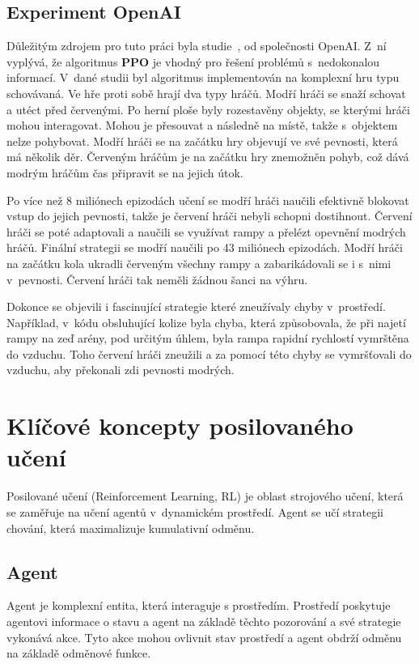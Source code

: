 \subsection{Experiment OpenAI}\label{subsec:experiment-openai}
Důležitým zdrojem pro tuto práci byla studie~\cite{PPO_Hide_Seek_paper}, od společnosti OpenAI.
Z~ní vyplývá, že algoritmus \textbf{PPO} je vhodný pro řešení problémů s~nedokonalou informací.
V~dané studii byl algoritmus implementován na komplexní hru typu schovávaná.
Ve hře proti sobě hrají dva typy hráčů.
Modří hráči se snaží schovat a utéct před červenými.
Po herní ploše byly rozestavěny objekty, se kterými hráči mohou interagovat.
Mohou je přesouvat a následně  na místě, takže s~objektem nelze pohybovat.
Modří hráči se na začátku hry objevují ve své pevnosti, která má několik děr.
Červeným hráčům je na začátku hry znemožněn pohyb, což dává modrým hráčům čas připravit se na jejich útok.

Po více než 8 miliónech epizodách učení se modří hráči naučili efektivně blokovat vstup do jejich pevnosti, takže je červení hráči nebyli schopni dostihnout.
Červení hráči se poté adaptovali a naučili se využívat rampy a přelézt opevnění modrých hráčů.
Finální strategii se modří naučili po 43 miliónech epizodách.
Modří hráči na začátku kola ukradli červeným všechny rampy a zabarikádovali se i s~nimi v~pevnosti.
Červení hráči tak neměli žádnou šanci na výhru.

Dokonce se objevili i fascinující strategie které zneužívaly chyby v~prostředí.
Například, v~kódu obsluhující kolize byla chyba, která způsobovala, že při najetí rampy na zeď arény, pod určitým úhlem, byla rampa rapidní rychlostí vymrštěna do vzduchu.
Toho červení hráči zneužili a za pomocí této chyby se vymršťovali do vzduchu, aby překonali zdi pevnosti modrých.


\section{Klíčové koncepty posilovaného učení}\label{sec:klicove-koncepty-posilovaneho-uceni}
Posilované učení (Reinforcement Learning, RL) je oblast strojového učení, která se zaměřuje na učení agentů v~dynamickém prostředí.
Agent se učí strategii chování, která maximalizuje kumulativní odměnu.

\subsection{Agent}\label{subsec:agent}
Agent je komplexní entita, která interaguje s prostředím.
Prostředí poskytuje agentovi informace o stavu a agent na základě těchto pozorování a své strategie vykonává akce.
Tyto akce mohou ovlivnit stav prostředí a agent obdrží odměnu na základě odměnové funkce.

